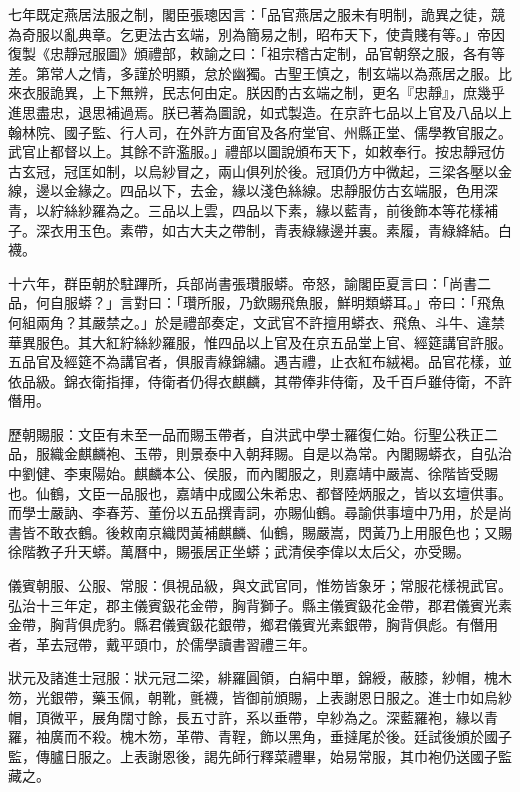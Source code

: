七年既定燕居法服之制，閣臣張璁因言：「品官燕居之服未有明制，詭異之徒，競為奇服以亂典章。乞更法古玄端，別為簡易之制，昭布天下，使貴賤有等。」帝因復製《忠靜冠服圖》頒禮部，敕諭之曰：「祖宗稽古定制，品官朝祭之服，各有等差。第常人之情，多謹於明顯，怠於幽獨。古聖王慎之，制玄端以為燕居之服。比來衣服詭異，上下無辨，民志何由定。朕因酌古玄端之制，更名『忠靜』，庶幾乎進思盡忠，退思補過焉。朕已著為圖說，如式製造。在京許七品以上官及八品以上翰林院、國子監、行人司，在外許方面官及各府堂官、州縣正堂、儒學教官服之。武官止都督以上。其餘不許濫服。」禮部以圖說頒布天下，如敕奉行。按忠靜冠仿古玄冠，冠匡如制，以烏紗冒之，兩山俱列於後。冠頂仍方中微起，三梁各壓以金線，邊以金緣之。四品以下，去金，緣以淺色絲線。忠靜服仿古玄端服，色用深青，以紵絲紗羅為之。三品以上雲，四品以下素，緣以藍青，前後飾本等花樣補子。深衣用玉色。素帶，如古大夫之帶制，青表綠緣邊并裏。素履，青綠絳結。白襪。

十六年，群臣朝於駐蹕所，兵部尚書張瓚服蟒。帝怒，諭閣臣夏言曰：「尚書二品，何自服蟒？」言對曰：「瓚所服，乃欽賜飛魚服，鮮明類蟒耳。」帝曰：「飛魚何組兩角？其嚴禁之。」於是禮部奏定，文武官不許擅用蟒衣、飛魚、斗牛、違禁華異服色。其大紅紵絲紗羅服，惟四品以上官及在京五品堂上官、經筵講官許服。五品官及經筵不為講官者，俱服青綠錦繡。遇吉禮，止衣紅布絨褐。品官花樣，並依品級。錦衣衛指揮，侍衛者仍得衣麒麟，其帶俸非侍衛，及千百戶雖侍衛，不許僭用。

歷朝賜服：文臣有未至一品而賜玉帶者，自洪武中學士羅復仁始。衍聖公秩正二品，服織金麒麟袍、玉帶，則景泰中入朝拜賜。自是以為常。內閣賜蟒衣，自弘治中劉健、李東陽始。麒麟本公、侯服，而內閣服之，則嘉靖中嚴嵩、徐階皆受賜也。仙鶴，文臣一品服也，嘉靖中成國公朱希忠、都督陸炳服之，皆以玄壇供事。而學士嚴訥、李春芳、董份以五品撰青詞，亦賜仙鶴。尋諭供事壇中乃用，於是尚書皆不敢衣鶴。後敕南京織閃黃補麒麟、仙鶴，賜嚴嵩，閃黃乃上用服色也；又賜徐階教子升天蟒。萬曆中，賜張居正坐蟒；武清侯李偉以太后父，亦受賜。

儀賓朝服、公服、常服：俱視品級，與文武官同，惟笏皆象牙；常服花樣視武官。弘治十三年定，郡主儀賓鈒花金帶，胸背獅子。縣主儀賓鈒花金帶，郡君儀賓光素金帶，胸背俱虎豹。縣君儀賓鈒花銀帶，鄉君儀賓光素銀帶，胸背俱彪。有僭用者，革去冠帶，戴平頭巾，於儒學讀書習禮三年。

狀元及諸進士冠服：狀元冠二梁，緋羅圓領，白絹中單，錦綬，蔽膝，紗帽，槐木笏，光銀帶，藥玉佩，朝靴，氈襪，皆御前頒賜，上表謝恩日服之。進士巾如烏紗帽，頂微平，展角闊寸餘，長五寸許，系以垂帶，皁紗為之。深藍羅袍，緣以青羅，袖廣而不殺。槐木笏，革帶、青鞓，飾以黑角，垂撻尾於後。廷試後頒於國子監，傳臚日服之。上表謝恩後，謁先師行釋菜禮畢，始易常服，其巾袍仍送國子監藏之。

